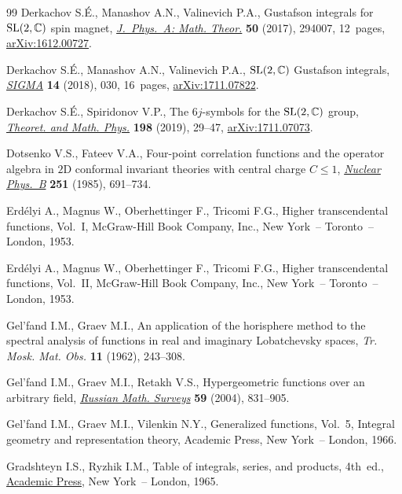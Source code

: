 \documentclass[pdftex]{sigma}
\numberwithin{equation}{section}
\begin{document}
\begin{thebibliography}{99}
Derkachov S.\'E., Manashov A.N., Valinevich P.A., Gustafson integrals for ${\rm
 SL}(2,{\mathbb C})$ spin magnet, \href{https://doi.org/10.1088/1751-8121/aa7480}{\textit{J.~Phys.~A: Math. Theor.}}
 \textbf{50} (2017), 294007, 12~pages, \href{https://arxiv.org/abs/1612.00727}{arXiv:1612.00727}.

Derkachov S.\'E., Manashov A.N., Valinevich P.A., {${\rm SL}(2,\mathbb{C})$}
 {G}ustafson integrals, \href{https://doi.org/10.3842/SIGMA.2018.030}{\textit{SIGMA}} \textbf{14} (2018), 030, 16~pages,
 \href{https://arxiv.org/abs/1711.07822}{arXiv:1711.07822}.

Derkachov S.\'E., Spiridonov V.P., The $6j$-symbols for the ${\rm SL}(2,{\mathbb C})$
 group, \href{https://doi.org/10.1134/S0040577919010033}{\textit{Theoret. and Math. Phys.}} \textbf{198} (2019), 29--47,
 \href{https://arxiv.org/abs/1711.07073}{arXiv:1711.07073}.

Dotsenko V.S., Fateev V.A., Four-point correlation functions and the operator
 algebra in {$2$}{D} conformal invariant theories with central charge {$C\leq
 1$}, \href{https://doi.org/10.1016/S0550-3213(85)80004-3}{\textit{Nuclear Phys.~B}} \textbf{251} (1985), 691--734.

Erd\'elyi A., Magnus W., Oberhettinger F., Tricomi F.G., Higher transcendental
 functions, {V}ol.~{I}, McGraw-Hill Book Company, Inc., New York~-- Toronto~--
 London, 1953.

Erd\'elyi A., Magnus W., Oberhettinger F., Tricomi F.G., Higher transcendental
 functions, {V}ol.~{II}, McGraw-Hill Book Company, Inc., New York~--
 Toronto~-- London, 1953.

Gel'fand I.M., Graev M.I., An application of the horisphere method to the
 spectral analysis of functions in real and imaginary {L}obatchevsky spaces,
 \textit{Tr. Mosk. Mat. Obs.} \textbf{11} (1962), 243--308.

Gel'fand I.M., Graev M.I., Retakh V.S., Hypergeometric functions over an
 arbitrary field, \href{https://doi.org/10.1070/RM2004v059n05ABEH000771}{\textit{Russian Math. Surveys}} \textbf{59} (2004), 831--905.

Gel'fand I.M., Graev M.I., Vilenkin N.Y., Generalized functions, {V}ol.~5,
 {I}ntegral geometry and representation theory, Academic Press, New York~--
 London, 1966.

Gradshteyn I.S., Ryzhik I.M., Table of integrals, series, and products, 4th~ed., \href{https://doi.org/10.1016/C2013-0-10754-4}{Academic Press}, New York~-- London, 1965.


\end{thebibliography}
\end{document}
